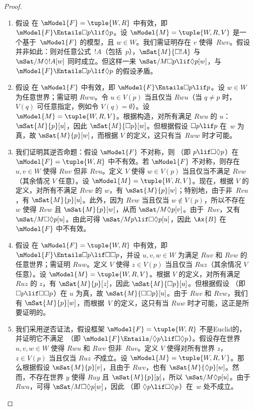 \documentclass[../../../include/open-logic-section]{subfiles}
\begin{document}
\begin{proof}
  \begin{enumerate}
  \item 假设  在 $\mModel{F} = \tuple{W, R}$ 中有效，即 $\mModel{F} \Entails \Box p \lif \Diamond p$。设 $\mModel{M} =
    \tuple{W, R, V}$ 是一个基于~$\mModel{F}$ 的模型，且 $w \in W$。我们需证明存在 $v$ 使得~$Rwv$。假设并非如此：则对任意公式~$!A$（包括~$p$），$\mSat{M}{\Box !A}$ 与 $\mSat/{M}{\Diamond !A}[w]$ 同时成立。但这样一来 $\mSat/{M}{\Box p \lif
      \Diamond p}[w]$，与 $\mModel{F} \Entails \Box p \lif \Diamond p$ 的假设矛盾。
  \item 假设  在 $\mModel{F}$ 中有效，即 $\mModel{F} \Entails \Box p \lif p$。设 $w \in W$ 为任意世界；需证明 $Rww$。令 $u \in V(p)$ 当且仅当 $Rwu$（当 $q \neq p$ 时，$V(q)$ 可任意指定，例如令 $V(q) = \emptyset$）。设 $\mModel{M} = \tuple{W, R, V}$。根据构造，对所有满足 $Rwu$ 的 $u$：$\mSat{M}{p}[u]$，因此 $\mSat{M}{\Box p}[w]$。但根据假设 $\Box p \lif p$ 在~$w$ 为真，故 $\mSat{M}{p}[w]$，而根据 $V$ 的定义，这只有当~$Rww$ 时才可能。
  \item 我们证明其逆否命题：假设 $\mModel{F}$ 不对称，则 （即 $p \lif \Box\Diamond p$）在 $\mModel{F}= \tuple{W, R}$ 中不有效。若 $\mModel{F}$ 不对称，则存在 $u, v \in W$ 使得 $Ruv$ 但非 $Rvu$。定义 $V$ 使得 $w \in V(p)$ 当且仅当不满足 $Rvw$（其余情况 $V$ 任意）。设 $\mModel{M} =\tuple{W, R,
      V}$。现在，根据 $V$ 的定义，对所有不满足 $Rvw$ 的 $w$，有 $\mSat{M}{p}[w]$；特别地，由于非~$Rvu$，有 $\mSat{M}{p}[u]$。此外，因为 $Rvw$ 当且仅当 $w \notin V(p)$，所以不存在 $w$ 使得 $Rvw$ 且 $\mSat{M}{p}[w]$，从而 $\mSat/{M}{\Diamond p}[v]$。由于~$Ruv$，又有 $\mSat/{M}{\Box\Diamond p}[u]$。由此可得 $\mSat/{M}{p \lif
      \Box\Diamond p}[u]$，因此 $\Ax{B}$ 在~$\mModel{F}$ 中不有效。
  \item 假设  在 $\mModel{F} = \tuple{W,R}$ 中有效，即 $\mModel{F} \Entails \Box p \lif \Box\Box p$，并设 $u, v, w \in W$ 为满足 $Ruv$ 和 $Rvw$ 的任意世界；需证明 $Ruw$。定义 $V$ 使得 $z \in V(p)$ 当且仅当 $Ruz$（其余情况 $V$ 任意）。设 $\mModel{M} =\tuple{W, R, V}$。根据 $V$ 的定义，对所有满足 $Ruz$ 的 $z$，有 $\mSat{M}{p}[z]$，因此 $\mSat{M}{\Box p}[u]$。但根据假设 （即 $\Box p \lif \Box \Box p$）在 $u$ 为真，故 $\mSat{M}{\Box \Box
      p}[u]$。由于 $Ruv$ 和 $Rvw$，我们有 $\mSat{M}{p}[w]$，而根据~$V$ 的定义，这只有当 $Ruw$ 时才可能，这正是所要证明的。
  \item 我们采用逆否证法，假设框架 $\mModel{F} = \tuple{W, R}$ 不是Euclid的，并证明它不满足~（即 $\mModel{F} \Entails/ \Diamond p \lif
      \Box\Diamond p$）。假设存在世界 $u, v, w \in W$ 使得 $Rwu$ 和 $Rwv$ 但非~$Ruv$。定义 $V$ 使得对所有世界 $z$，$z \in V(p)$ 当且仅当 $Ruz$ \emph{不}成立。设 $\mModel{M} =\tuple{W, R, V}$。那么根据假设 $\mSat{M}{p}[v]$，且由于 $Rwv$，也有 $\mSat{M}{\Diamond p}[w]$。然而，不存在世界 $y$ 使得 $Ruy$ 且 $\mSat{M}{p}[y]$，所以 $\mSat/{M}{\Diamond
      p}[u]$。由于 $Rwu$，可得 $\mSat/{M}{\Box\Diamond
      p}[w]$，因此 （即 $\Diamond p \lif \Box\Diamond p$）在~$w$ 处不成立。
  \end{enumerate}
\end{proof}
\end{document}
